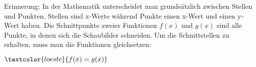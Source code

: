 Erinnerung: In der Mathematik unterscheidet man grundsätzlich zwischen Stellen und Punkten. Stellen sind x-Werte während Punkte einen x-Wert und einen y-Wert haben. Die Schnittpunkte zweier Funktionen \(f(x)\) und \(g(x)\) sind alle Punkte, in denen sich die Schaubilder schneiden. Um die Schnittstellen zu erhalten, muss man die Funktionen gleichsetzen:
\begin{tcolorbox}\centering
	\(\textcolor{loestc}{f(x)=g(x)}\)
\end{tcolorbox}

\begin{minipage}{\textwidth}
\end{minipage}%

\bigskip

